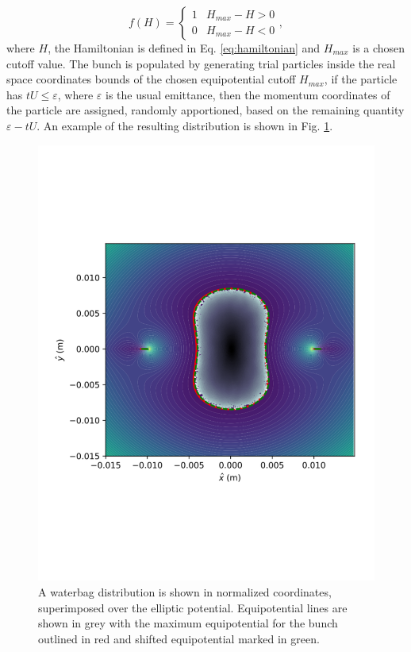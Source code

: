\documentclass[aps,prstab,twocolumn, groupedaddress]{revtex4-1}
\begin{document}
\begin{equation} \label{eq:distribution}
f(H) = 
\left\{
\begin{array}{lr}
1 &  H_{max} - H > 0 \\
0 &  H_{max} - H < 0
\end{array}
\right.,
\end{equation} 
where $H$, the Hamiltonian is defined in Eq. \ref{eq:hamiltonian} and $H_{max}$ is a 
chosen cutoff value. The bunch is populated by generating trial particles inside the real 
space coordinates bounds of the chosen equipotential cutoff $H_{max}$, if the particle 
has $ tU \leq \varepsilon$, where $\varepsilon$ is the usual emittance, then the 
momentum coordinates of the particle are assigned, randomly apportioned,  based on the 
remaining quantity $\varepsilon - tU$. An example of the resulting distribution is shown in 
Fig. \ref{fig:wbdistr}.
\begin{figure}
	\includegraphics[width=\columnwidth]{distribution.pdf}%
	\caption{\label{fig:wbdistr} A waterbag distribution is shown in normalized coordinates, 
	superimposed over the elliptic potential. Equipotential lines are shown in grey with the 
	maximum equipotential for the bunch outlined in red and shifted equipotential marked 
	in green.}
\end{figure}
\end{document}
